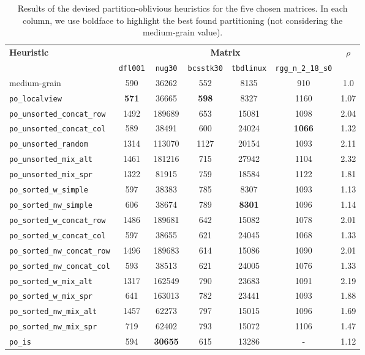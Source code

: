 \begin{table}[h]
	\centering

	\renewcommand{\arraystretch}{1.2}
	\begin{tabular}{|l||c|c|c|c|c||c|}
		\hline
		\multirow{2}{*}{\textbf{Heuristic}} &  \multicolumn{5}{|c||}{\textbf{Matrix}} & \multirow{2}{*}{$\rho$} \\ \cline{2-6}
		& \texttt{dfl001} & \texttt{nug30} & \texttt{bcsstk30} & \texttt{tbdlinux} & \texttt{rgg\_n\_2\_18\_s0} & \\ \hline
		medium-grain & 590 & 36262 & 552 & 8135 & 910 & 1.0 \\ \hline %
		\verb|po_localview|& \textbf{571} & 36665 & \textbf{598} & 8327 & 1160  & 1.07 \\  %
		\verb|po_unsorted_concat_row|& 1492 & 189689 & 653 & 15081 & 1098 & 2.04 \\ %
		\verb|po_unsorted_concat_col|& 589 & 38491  & 600 & 24024 & \textbf{1066} & 1.32 \\ %
		\verb|po_unsorted_random|& 1314 & 113070 & 1127 & 20154 & 1093 & 2.11 \\  %
		\verb|po_unsorted_mix_alt|& 1461 & 181216 & 715 & 27942 & 1104 & 2.32 \\  %
		\verb|po_unsorted_mix_spr|& 1322 & 81915 & 759 & 18584 & 1122 & 1.81 \\  %
		\verb|po_sorted_w_simple|& 597 & 38383 & 785  & 8307 & 1093 & 1.13 \\ %
		\verb|po_sorted_nw_simple|& 606 & 38674 & 789 & \textbf{8301} & 1096 & 1.14 \\ %
		\verb|po_sorted_w_concat_row|& 1486 & 189681 & 642 & 15082 & 1078 & 2.01 \\ %
		\verb|po_sorted_w_concat_col|& 597 & 38655 & 621 & 24045 & 1068 & 1.33 \\  %
		\verb|po_sorted_nw_concat_row|& 1496 & 189683 & 614 & 15086 & 1090 & 2.01 \\ %
		\verb|po_sorted_nw_concat_col|& 593 & 38513 & 621 & 24005 & 1076 & 1.33 \\ %
		\verb|po_sorted_w_mix_alt|& 1317 & 162549 & 790 & 23683 & 1091 & 2.19 \\ %
		\verb|po_sorted_w_mix_spr|& 641 & 163013 & 782 & 23441 & 1093 & 1.88 \\ %
		\verb|po_sorted_nw_mix_alt|& 1457 & 62273 & 797 & 15015 & 1096 & 1.69 \\ %
		\verb|po_sorted_nw_mix_spr|& 719 & 62402 & 793 & 15072 & 1106 & 1.47 \\  %
		\verb|po_is|& 594 & \textbf{30655} & 615 & 13286 & -  & 1.12 \\ %
		\hline
	\end{tabular}
	\caption{Results of the devised partition-oblivious heuristics for the five chosen matrices. In each column, we use boldface to highlight the best found partitioning (not considering the medium-grain value).} \label{tab:preliminary_po}
\end{table}

